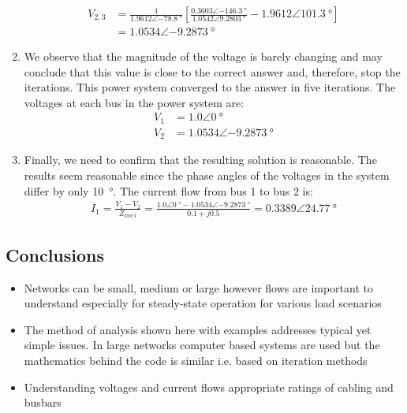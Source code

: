 \begin{enumerate}
	      \begin{align}
		      V_{2,3} & = \frac{1}{1.9612\angle\SI{-78.8}{\degree}}\left[\frac{0.3603\angle\SI{-146.3}{\degree}}{1.0542\angle\SI{9.2803}{\degree}}-1.9612\angle\SI{101.3}{\degree}\right] \\
		              & = 1.0534\angle\SI{-9.2873}{\degree}
	      \end{align}
	\item We observe that the magnitude of the voltage is barely changing and may conclude that this value is close to the correct answer and, therefore, stop the iterations. This power system converged to the answer in five iterations. The voltages at each bus in the power system are:
	      \begin{align}
		      V_1 & = 1.0\angle\SI{0}{\degree}          \\
		      V_2 & = 1.0534\angle\SI{-9.2873}{\degree}
	      \end{align}
	\item Finally, we need to confirm that the resulting solution is reasonable. The results seem reasonable since the phase angles of the voltages in the system differ by only \SI{10}{\degree}. The current flow from bus 1 to bus 2 is:
	      \begin{gather}
		      I_1 = \frac{V_1-V_2}{Z_{line1}} = \frac{1.0\angle\SI{0}{\degree} - 1.0534\angle\SI{-9.2873}{\degree}}{0.1+j0.5} = 0.3389\angle\SI{24.77}{\degree}
	      \end{gather}
\end{enumerate}
\subsection{Conclusions}
\begin{itemize}
	\item Networks can be small, medium or large however flows are important to understand especially for steady-state operation for various load scenarios
	\item The method of analysis shown here with examples addresses typical yet simple issues. In large networks computer based systems are used but the mathematics behind the code is similar i.e. based on iteration methods
	\item Understanding voltages and current flows appropriate ratings of cabling and busbars
\end{itemize}
